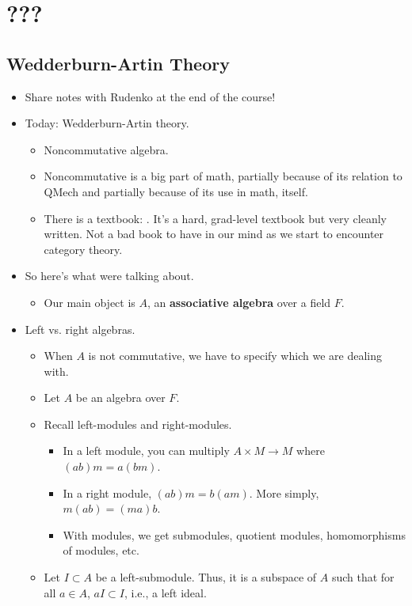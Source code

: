 \documentclass[../notes.tex]{subfiles}
\begin{document}
\chapter{???}
\section{Wedderburn-Artin Theory}
\begin{itemize}
    \item {}Share notes with Rudenko at the end of the course!
    \item Today: Wedderburn-Artin theory.
    \begin{itemize}
        \item Noncommutative algebra.
        \item Noncommutative is a big part of math, partially because of its relation to QMech and partially because of its use in math, itself.
        \item There is a textbook: \textcite{bib:Lang}. It's a hard, grad-level textbook but very cleanly written. Not a bad book to have in our mind as we start to encounter category theory.
    \end{itemize}
    \item So here's what were talking about.
    \begin{itemize}
        \item Our main object is $A$, an \textbf{associative algebra} over a field $F$.
    \end{itemize}
    \item Left vs. right algebras.
    \begin{itemize}
        \item When $A$ is not commutative, we have to specify which we are dealing with.
        \item Let $A$ be an algebra over $F$.
        \item Recall left-modules and right-modules.
        \begin{itemize}
            \item In a left module, you can multiply $A\times M\to M$ where $(ab)m=a(bm)$.
            \item In a right module, $(ab)m=b(am)$. More simply, $m(ab)=(ma)b$.
            \item With modules, we get submodules, quotient modules, homomorphisms of modules, etc.
        \end{itemize}
        \item Let $I\subset A$ be a left-submodule. Thus, it is a subspace of $A$ such that for all $a\in A$, $aI\subset I$, i.e., a left ideal.

\end{itemize}
\end{itemize}
\end{document}
